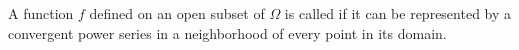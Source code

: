 A function $f$ defined on an open subset of $\Omega$ is called  if it can be represented by a convergent power series in a neighborhood of every point in its domain.